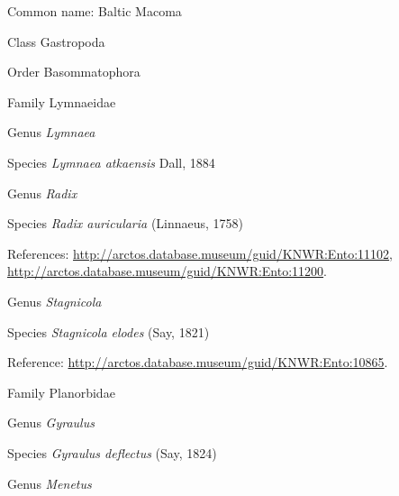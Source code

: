 \documentclass[9pt, article]{memoir}
\begin{document}
\begin{multicols}{2}
Common name: Baltic Macoma

\vspace{6pt}\noindent\hspace{12pt}Class Gastropoda


\vspace{6pt}\noindent\hspace{18pt}Order Basommatophora


\vspace{6pt}\noindent\hspace{24pt}Family Lymnaeidae


\vspace{6pt}\noindent\hspace{30pt}Genus \textit{Lymnaea}


\vspace{6pt}\noindent\hspace{36pt}Species \textit{Lymnaea atkaensis} Dall, 1884


\vspace{6pt}\noindent\hspace{30pt}Genus \textit{Radix}


\vspace{6pt}\noindent\hspace{36pt}Species \textit{Radix auricularia} (Linnaeus, 1758)


References: 
\url{http://arctos.database.museum/guid/KNWR:Ento:11102}, 
\url{http://arctos.database.museum/guid/KNWR:Ento:11200}.

\vspace{6pt}\noindent\hspace{30pt}Genus \textit{Stagnicola}


\vspace{6pt}\noindent\hspace{36pt}Species \textit{Stagnicola elodes} (Say, 1821)


Reference: 
\url{http://arctos.database.museum/guid/KNWR:Ento:10865}.

\vspace{6pt}\noindent\hspace{24pt}Family Planorbidae


\vspace{6pt}\noindent\hspace{30pt}Genus \textit{Gyraulus}


\vspace{6pt}\noindent\hspace{36pt}Species \textit{Gyraulus deflectus} (Say, 1824)


\vspace{6pt}\noindent\hspace{30pt}Genus \textit{Menetus}



\end{multicols}
\end{document}
